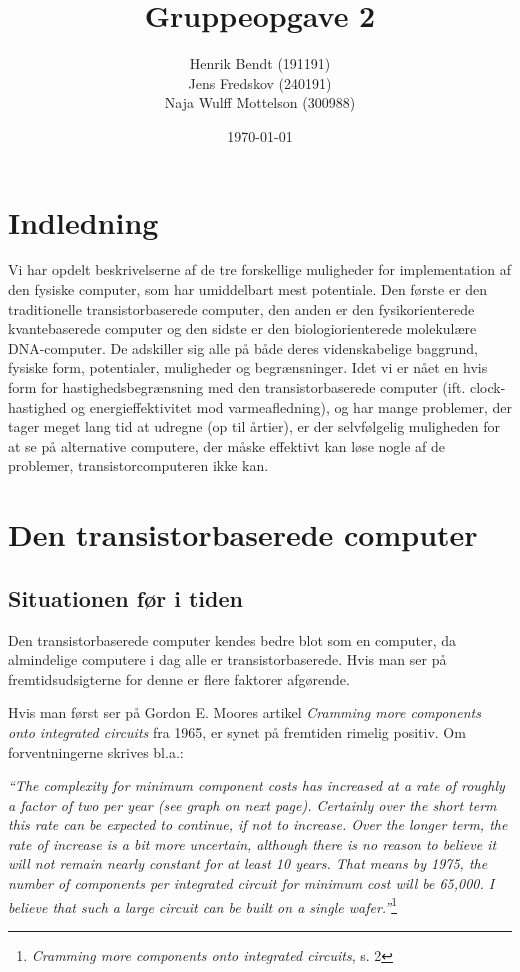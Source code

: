 \documentclass[10pt,a4paper]{article}
\title{Gruppeopgave 2}
\author{Henrik Bendt (191191)\\Jens Fredskov (240191)\\Naja Wulff Mottelson (300988)}
\date{\today}
\newcommand{\citat}[2]{\begin{justify}\textit{``#1''}\hspace{0.1cm}\footnote{#2}\end{justify}}
\begin{document}
\maketitle

\section{Indledning}
Vi har opdelt beskrivelserne af de tre forskellige muligheder for
implementation af den fysiske computer, som har umiddelbart mest potentiale.
Den første er den traditionelle transistorbaserede computer, den anden er den
fysikorienterede kvantebaserede computer og den sidste er den
biologiorienterede molekulære DNA-computer. De adskiller sig alle på både deres
videnskabelige baggrund, fysiske form, potentialer, muligheder og
begrænsninger. Idet vi er nået en hvis form for hastighedsbegrænsning med den
transistorbaserede computer (ift. clock-hastighed og energieffektivitet mod
varmeafledning), og har mange problemer, der tager meget lang tid at udregne (op
til årtier), er der selvfølgelig muligheden for at se på alternative computere,
der måske effektivt kan løse nogle af de problemer, transistorcomputeren ikke
kan.

\section{Den transistorbaserede computer}
\subsection{Situationen før i tiden}
Den transistorbaserede computer kendes bedre blot som en computer, da almindelige computere i dag alle er transistorbaserede. Hvis man ser på fremtidsudsigterne for denne er flere faktorer afgørende.

Hvis man først ser på Gordon E. Moores artikel \textit{Cramming more components onto integrated circuits} fra 1965, er synet på fremtiden rimelig positiv. Om forventningerne skrives bl.a.:
\citat{The complexity for minimum component costs has increased at a rate of roughly a factor of two per year (see graph on next page). Certainly over the short term this rate can be expected to continue, if not to increase. Over the longer term, the rate of increase is a bit more uncertain, although there is no reason to believe it will not remain nearly constant for at least 10 years. That means by 1975, the number of components per integrated circuit for minimum cost will be 65,000. I believe that such a large circuit can be built on a single wafer.}{\textit{Cramming more components onto integrated circuits}, s. 2}
\end{document}
